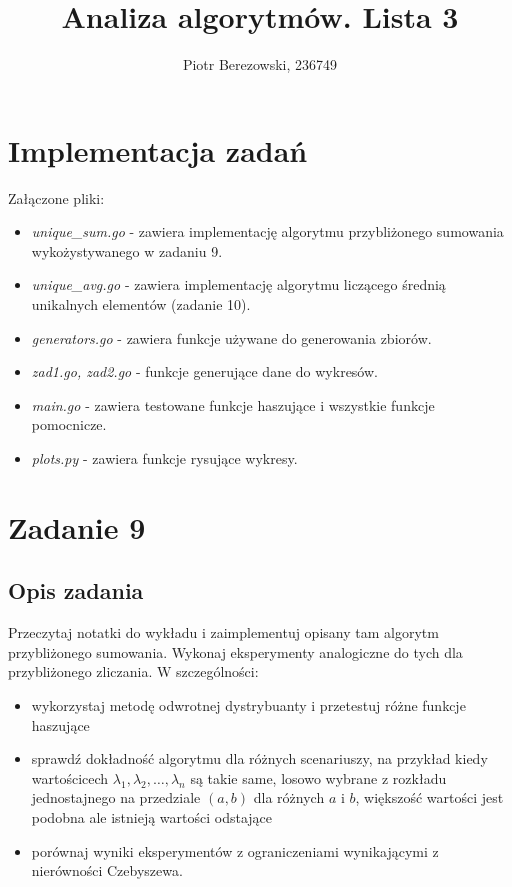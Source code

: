 \documentclass{article}
\title{Analiza algorytmów. Lista 3}
\author{Piotr Berezowski, 236749}
\begin{document}
	\maketitle
	\newpage
    
    \section{Implementacja zadań}
        Załączone pliki:
        \begin{itemize}
            \item \textit{unique\_sum.go} - zawiera implementację algorytmu przybliżonego sumowania wykożystywanego w zadaniu 9.
            \item \textit{unique\_avg.go} - zawiera implementację algorytmu liczącego średnią unikalnych elementów (zadanie 10).
            \item \textit{generators.go} - zawiera funkcje używane do generowania zbiorów.
            \item \textit{zad1.go, zad2.go} - funkcje generujące dane do wykresów.
            \item \textit{main.go} - zawiera testowane funkcje haszujące i wszystkie funkcje pomocnicze.
            \item \textit{plots.py} - zawiera funkcje rysujące wykresy.
        \end{itemize}
	
	\section{Zadanie 9}
	\subsection{Opis zadania}

        Przeczytaj notatki do wykładu i zaimplementuj opisany tam algorytm przybliżonego sumowania. Wykonaj eksperymenty analogiczne do tych dla przybliżonego zliczania. 
        W szczególności:
        \begin{itemize}
            \item wykorzystaj metodę odwrotnej dystrybuanty i przetestuj różne funkcje haszujące
            \item sprawdź dokładność algorytmu dla różnych scenariuszy, na przykład kiedy wartościcech $\lambda_1, \lambda_2, \dots, \lambda_n$ są takie same, losowo 
                wybrane z rozkładu jednostajnego na przedziale $(a,b)$ dla różnych $a$ i $b$, większość wartości jest podobna ale istnieją wartości odstające
            \item porównaj wyniki eksperymentów z ograniczeniami wynikającymi z nierówności Czebyszewa.
        \end{itemize}
    
\end{document}
